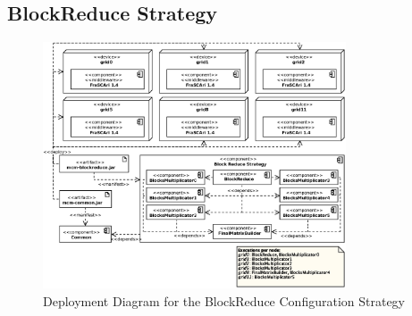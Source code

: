 \documentclass{article}
\begin{document}

\subsection{BlockReduce Strategy}

\begin{figure}[H]
	\centering
	\includegraphics[width=0.8\textwidth]{fig/evaluation/blockreduce-deployment}
	\caption[]{Deployment Diagram for the BlockReduce Configuration Strategy}
	\label{fig:apx-eval-amelia-blockreduce}
\end{figure}
\end{document}
